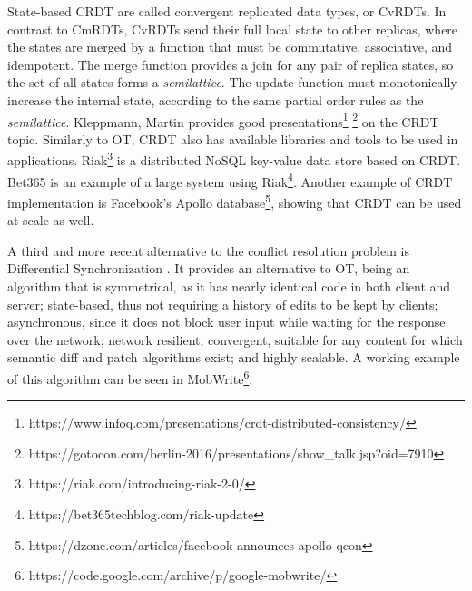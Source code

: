 State-based CRDT are called convergent replicated data types, or CvRDTs. In contrast to CmRDTs, CvRDTs send their full local state to other replicas, where the states are merged by a function that must be commutative, associative, and idempotent. The merge function provides a join for any pair of replica states, so the set of all states forms a \textit{semilattice}. The update function must monotonically increase the internal state, according to the same partial order rules as the \textit{semilattice}. Kleppmann, Martin provides good presentations\footnote{https://www.infoq.com/presentations/crdt-distributed-consistency/} \footnote{https://gotocon.com/berlin-2016/presentations/show\_talk.jsp?oid=7910} on the CRDT topic. Similarly to OT, CRDT also has available libraries and tools to be used in applications. Riak\footnote{https://riak.com/introducing-riak-2-0/} is a distributed NoSQL key-value data store based on CRDT. Bet365 is an example of a large system using Riak\footnote{https://bet365techblog.com/riak-update}. Another example of CRDT implementation is Facebook's Apollo database\footnote{https://dzone.com/articles/facebook-announces-apollo-qcon}, showing that CRDT can be used at scale as well.

A third and more recent alternative to the conflict resolution problem is Differential Synchronization \cite{Fraser2009} \cite{Fraser-diff-sync-web}. It provides an alternative to OT, being an algorithm that is symmetrical, as it has nearly identical code in both client and server; state-based, thus not requiring a history of edits to be kept by clients; asynchronous, since it does not block user input while waiting for the response over the network; network resilient, convergent, suitable for any content for which semantic diff and patch algorithms exist; and highly scalable. A working example of this algorithm can be seen in MobWrite\footnote{https://code.google.com/archive/p/google-mobwrite/}.


